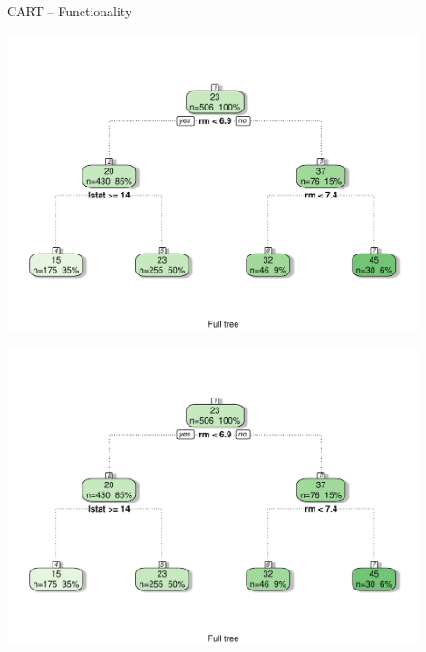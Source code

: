 \documentclass[11pt,compress,t,notes=noshow, xcolor=table]{beamer}
\begin{document}
\begin{frame}{CART -- Functionality}
\begin{minipage}{0.5\textwidth}
  \includegraphics[width=0.9\textwidth]{figure/cart.pdf}
\end{minipage}%
\begin{minipage}{0.5\textwidth}
  \includegraphics[width=0.9\textwidth]{figure/cart.pdf}
\end{minipage}

\end{frame}

\end{document}
